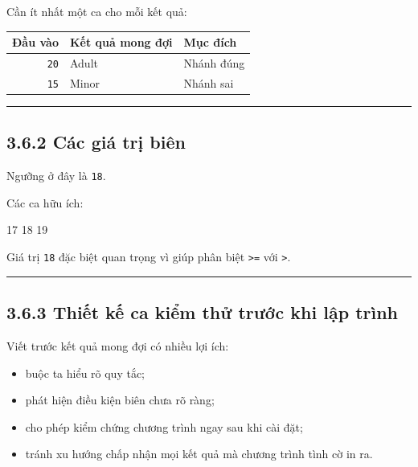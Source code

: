 \documentclass[
  11pt,
  a4paper,
]{article}
\newenvironment{Shaded}{}{}
\newcommand{\NormalTok}[1]{#1}
\providecommand{\tightlist}{%
  \setlength{\itemsep}{0pt}\setlength{\parskip}{0pt}}
\begin{document}
Cần ít nhất một ca cho mỗi kết quả:

\begin{longtable}[]{@{}rll@{}}
\toprule\noalign{}
Đầu vào & Kết quả mong đợi & Mục đích \\
\midrule\noalign{}
\endhead
\bottomrule\noalign{}
\endlastfoot
\texttt{20} & Adult & Nhánh đúng \\
\texttt{15} & Minor & Nhánh sai \\
\end{longtable}

\begin{center}\rule{0.5\linewidth}{0.5pt}\end{center}

\subsection{3.6.2 Các giá trị
biên}\label{cuxe1c-giuxe1-trux1ecb-biuxean}

Ngưỡng ở đây là \texttt{18}.

Các ca hữu ích:

\begin{Shaded}
\begin{Highlighting}[]
\NormalTok{17}
\NormalTok{18}
\NormalTok{19}
\end{Highlighting}
\end{Shaded}

Giá trị \texttt{18} đặc biệt quan trọng vì giúp phân biệt
\texttt{\textgreater{}=} với \texttt{\textgreater{}}.

\begin{center}\rule{0.5\linewidth}{0.5pt}\end{center}

\subsection{3.6.3 Thiết kế ca kiểm thử trước khi lập
trình}\label{thiux1ebft-kux1ebf-ca-kiux1ec3m-thux1eed-trux1b0ux1edbc-khi-lux1eadp-truxecnh}

Viết trước kết quả mong đợi có nhiều lợi ích:

\begin{itemize}
\tightlist
\item
  buộc ta hiểu rõ quy tắc;
\item
  phát hiện điều kiện biên chưa rõ ràng;
\item
  cho phép kiểm chứng chương trình ngay sau khi cài đặt;
\item
  tránh xu hướng chấp nhận mọi kết quả mà chương trình tình cờ in ra.
\end{itemize}
\end{document}

